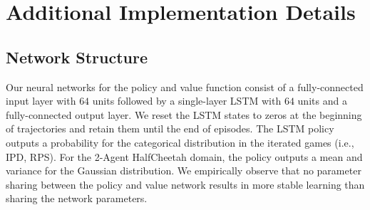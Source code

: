 \section{Additional Implementation Details}\label{sec:implementation-details}

\subsection{Network Structure}
Our neural networks for the policy and value function consist of a fully-connected input layer with $64$ units followed by a single-layer LSTM with $64$ units and a fully-connected output layer. 
We reset the LSTM states to zeros at the beginning of trajectories and retain them until the end of episodes. 
The LSTM policy outputs a probability for the categorical distribution in the iterated games (i.e., IPD, RPS). 
For the 2-Agent HalfCheetah domain, the policy outputs a mean and variance for the Gaussian distribution. 
We empirically observe that no parameter sharing between the policy and value network results in more stable learning than sharing the network parameters.

